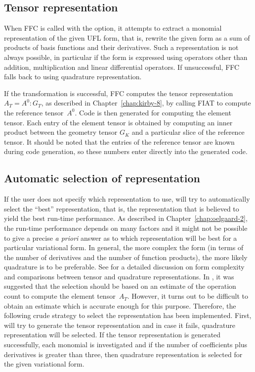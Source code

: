 \subsection{Tensor representation}

When FFC is called with the  option,
it attempts to extract a monomial representation of the given UFL
form, that is, rewrite the given form as a sum of products of basis
functions and their derivatives. Such a representation is not always
possible, in particular if the form is expressed using operators other
than addition, multiplication and linear differential operators. If
unsuccessful, FFC falls back to using quadrature representation.

If the transformation is successful, FFC computes the tensor
representation $A_T = A^0 : G_T$, as described in Chapter~\ref{chap:kirby-8},
by calling FIAT to compute the reference tensor~$A^0$. Code is then
generated for computing the element tensor. Each entry of the element
tensor is obtained by computing an inner product between the geometry
tensor $G_K$ and a particular slice of the reference tensor. It should
be noted that the entries of the reference tensor are known during
code generation, so these numbers enter directly into the generated
code.

\subsection{Automatic selection of representation}

If the user does not specify which representation to use, \ffc{} will
try to automatically select the ``best'' representation, that is, the
representation that is believed to yield the best run-time
performance. As described in Chapter~\ref{chap:oelgaard-2}, the
run-time performance depends on many factors and it might not be
possible to give a precise \emph{a priori} answer as to which
representation will be best for a particular variational form. In
general, the more complex the form (in terms of the number of
derivatives and the number of function products), the more likely
quadrature is to be preferable. See \citet{OelgaardWells2010} for a
detailed discussion on form complexity and comparisons between tensor
and quadrature representations. In \citet{OelgaardWells2010}, it was
suggested that the selection should be based on an estimate of the
operation count to compute the element tensor~$A_T$.  However, it
turns out to be difficult to obtain an estimate which is accurate
enough for this purpose. Therefore, the following crude strategy to
select the representation has been implemented. First, \ffc{} will try
to generate the tensor representation and in case it fails, quadrature
representation will be selected. If the tensor representation is
generated successfully, each monomial is investigated and if the
number of coefficients plus derivatives is greater than three, then
quadrature representation is selected for the given variational form.

